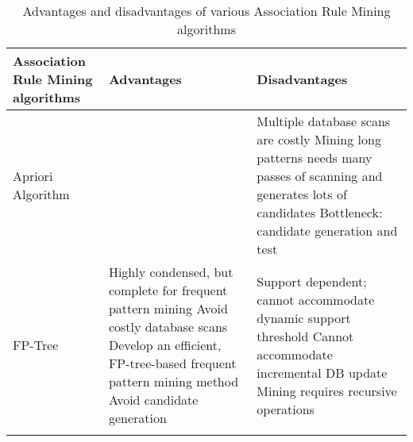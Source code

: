 \clearpage
\begin{longtable}{ | P{3cm} | P{5cm} | P{5cm} | } 
\hline
    \textbf{Association Rule Mining algorithms} & \textbf{Advantages} & \textbf{Disadvantages} \\ \hline
    Apriori Algorithm &
    &
        Multiple database scans are costly \newline \newline
        Mining long patterns needs many passes of scanning and generates lots of candidates \newline \newline 
        Bottleneck: candidate generation and test \\ \hline
    FP-Tree &
        Highly condensed, but complete for frequent pattern mining \newline \newline 
        Avoid costly database scans \newline \newline
        Develop an efficient, FP-tree-based frequent pattern mining method \newline \newline
        Avoid candidate generation
    & 
        Support dependent; cannot accommodate dynamic support threshold \newline \newline
        Cannot accommodate incremental DB update \newline \newline 
        Mining requires recursive operations \\ \hline
\caption{Advantages and disadvantages of various Association Rule Mining algorithms}
\label{table:3}
\end{longtable}

